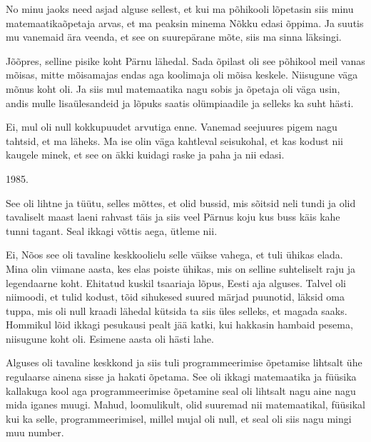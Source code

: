 
No minu jaoks need asjad alguse sellest, et kui ma põhikooli lõpetasin siis 
minu matemaatikaõpetaja arvas, et ma peaksin minema Nõkku edasi õppima. Ja suutis mu vanemaid ära veenda, et see on suurepärane 
mõte, siis ma sinna läksingi.


Jõõpres, selline pisike koht Pärnu 
lähedal. Sada õpilast oli see põhikool meil vanas  mõisas, mitte mõisamajas 
endas aga koolimaja oli mõisa keskele. Niisugune väga mõnus koht oli. Ja siis 
mul matemaatika nagu sobis ja õpetaja oli väga usin, andis mulle lisaülesandeid 
ja lõpuks saatis olümpiaadile ja selleks ka suht hästi.



Ei, mul oli null kokkupuudet arvutiga enne. Vanemad seejuures pigem nagu 
tahtsid, et ma läheks. Ma ise olin väga  kahtleval seisukohal, et kas kodust 
nii kaugele minek, et see on äkki kuidagi raske ja paha ja nii edasi. 


1985. 


See oli lihtne ja tüütu, selles mõttes, et olid bussid, mis sõitsid neli tundi 
ja olid tavaliselt maast laeni rahvast täis ja siis veel Pärnus koju kus buss 
käis kahe tunni tagant. Seal ikkagi võttis aega, ütleme nii.  


Ei, Nõos see oli tavaline keskkoolielu selle väikse vahega, et tuli ühikas 
elada. Mina olin viimane aasta, kes elas poiste ühikas, mis on selline 
suhteliselt raju ja legendaarne koht. Ehitatud kuskil tsaariaja lõpus, Eesti 
aja alguses. Talvel oli niimoodi, et tulid  kodust, tõid sihukesed suured 
märjad puunotid, läksid oma tuppa, mis oli  null kraadi lähedal kütsida ta siis 
üles selleks, et magada saaks. Hommikul lõid ikkagi pesukausi pealt jää katki, 
kui hakkasin hambaid pesema, niisugune koht oli. Esimene aasta oli hästi lahe. 

Alguses oli tavaline keskkond ja siis tuli programmeerimise õpetamise lihtsalt 
ühe regulaarse ainena sisse ja hakati õpetama. See oli ikkagi matemaatika ja 
füüsika kallakuga kool aga programmeerimise õpetamine seal oli lihtsalt nagu 
aine nagu mida iganes muugi. Mahud, loomulikult, olid suuremad nii 
matemaatikal, füüsikal kui ka selle, programmeerimisel, millel mujal oli null, 
et seal oli siis nagu mingi muu number.

